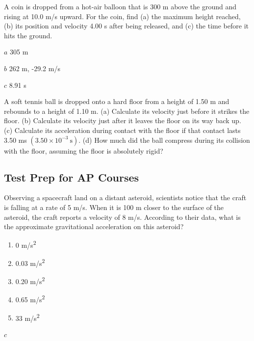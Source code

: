 \documentclass[
]{book}
\providecommand{\tightlist}{%
  \setlength{\itemsep}{0pt}\setlength{\parskip}{0pt}}
\newenvironment{problems-exercises}{}{}
\newenvironment{ap-test-prep}{}{}
\begin{document}
\begin{problems-exercises}
\hypertarget{fs-id2227967}{}
\leavevmode\hypertarget{fs-id1934778}{}%
A coin is dropped from a hot-air balloon that is 300 m above the ground
and rising at 10.0 m/s upward. For the coin, find (a) the maximum height
reached, (b) its position and velocity 4.00 s after being released, and
(c) the time before it hits the ground.

\leavevmode\hypertarget{fs-id3557416}{}%
\(a\) 305 m

\(b\) 262 m, -29.2 m/s

\(c\) 8.91 s

\hypertarget{fs-id3597625}{}
\leavevmode\hypertarget{fs-id3502580}{}%
A soft tennis ball is dropped onto a hard floor from a height of 1.50 m
and rebounds to a height of 1.10 m. (a) Calculate its velocity just
before it strikes the floor. (b) Calculate its velocity just after it
leaves the floor on its way back up. (c) Calculate its acceleration
during contact with the floor if that contact lasts 3.50 ms
\({(3\text{.}{\text{50} \times \text{10}^{- 3}}\ \text{s})}{}\). (d) How
much did the ball compress during its collision with the floor, assuming
the floor is absolutely rigid?

\end{problems-exercises}

\hypertarget{fs-id2378715}{}
\begin{ap-test-prep}

\hypertarget{test-prep-for-ap-courses-5}{%
\subsection{Test Prep for AP Courses}\label{test-prep-for-ap-courses-5}}

\hypertarget{fs-id2378722}{}
\leavevmode\hypertarget{fs-id2378725}{}%
Observing a spacecraft land on a distant asteroid, scientists notice
that the craft is falling at a rate of 5 m/s. When it is 100 m closer to
the surface of the asteroid, the craft reports a velocity of 8 m/s.
According to their data, what is the approximate gravitational
acceleration on this asteroid?

\begin{enumerate}
\def\labelenumi{\alph{enumi}.}
\tightlist
\item
  0 m/s\textsuperscript{2}
\item
  0.03 m/s\textsuperscript{2}
\item
  0.20 m/s\textsuperscript{2}
\item
  0.65 m/s\textsuperscript{2}
\item
  33 m/s\textsuperscript{2}
\end{enumerate}

\leavevmode\hypertarget{fs-id2346806}{}%
\(c\)

\end{ap-test-prep}
\end{document}
